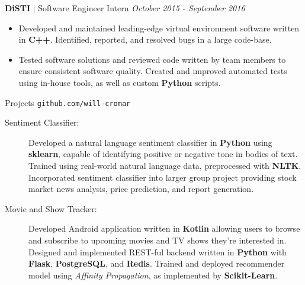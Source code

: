 \documentclass[letterpaper,11pt,oneside]{article}
\newcommand{\resheader}[2][]{
  \vspace{9pt}
  {\LARGE #2} #1
  \\
}
\newcommand{\ressubheader}[3][]{
  \vspace{6pt}
  {\large \textbf{#2} #1} \hfill \emph{#3}
  \\
}
\newcommand{\resskill}[1]{\textbf{#1}}
\begin{document}
\ressubheader[| Software Engineer Intern]{DiSTI}{October 2015 - September 2016}
\begin{itemize}
  \item Developed and maintained leading-edge virtual environment software written in \resskill{C++}. Identified, reported, and resolved bugs in a large code-base.
  \item Tested software solutions and reviewed code written by team members to ensure consistent software quality. Created and improved automated tests using in-house tools, as well as custom \resskill{Python} scripts.
\end{itemize}

\resheader[\hfill \texttt{github.com/will-cromar}]{Projects}
\begin{description}
  \item [Sentiment Classifier:] Developed a natural language sentiment classifier in \resskill{Python} using \resskill{sklearn}, capable of identifying positive or negative tone in bodies of text. Trained using real-world natural language data, preprocessed with \resskill{NLTK}. Incorporated sentiment classifier into larger group project providing stock market news analysis, price prediction, and report generation.
  \item [Movie and Show Tracker:] Developed Android application written in \resskill{Kotlin} allowing users to browse and subscribe to upcoming movies and TV shows they're interested in. Designed and implemented REST-ful backend written in \resskill{Python} with \resskill{Flask}, \resskill{PostgreSQL}, and \resskill{Redis}. Trained and deployed recommender model using \emph{Affinity Propagation}, as implemented by \resskill{Scikit-Learn}.  
\end{description}    
\end{document}
